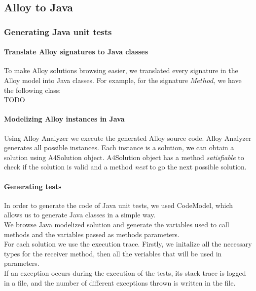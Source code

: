 \subsection{Alloy to Java}
\subsubsection{Generating Java unit tests}

\paragraph{Translate Alloy signatures to Java classes}
To make Alloy solutions browsing easier, we translated every signature in the Alloy model into Java classes. For example, for the signature $Method$, we have the following class: \\

TODO


\paragraph{Modelizing Alloy instances in Java}
Using Alloy Analyzer we execute the generated Alloy source code. Alloy Analyzer generates all possible instances.
Each instance is a solution, we can obtain a solution using A4Solution object. A4Solution object has a method \textit{satisfiable} to check if the solution is valid and a method \textit{next} to go the next possible solution.

\paragraph{Generating tests}
In order to generate the code of Java unit tests, we used CodeModel, which allows us to generate Java classes in a simple way.\\
We browse Java modelized solution and generate the variables used to call methods and the variables passed as methods parameters.\\
For each solution we use the execution trace.
Firstly, we initalize all the necessary types for the receiver method, then all the veriables that will be used in parameters. \\
If an exception occurs during the execution of the tests, its stack trace is logged in a file, and the number of different exceptions thrown is written in the file.\\

